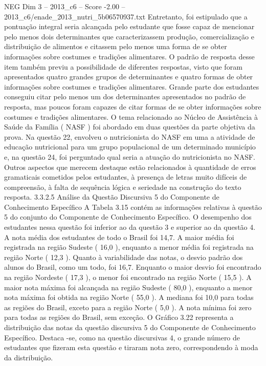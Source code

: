\begin{textsample}{NEG Dim 3 – 2013\_c6 – Score -2.00 – 2013\_c6/enade\_2013\_nutri\_5b06570937.txt}
Entretanto, foi estipulado que a pontuação integral seria alcançada pelo estudante que fosse capaz de mencionar pelo menos dois determinantes que caracterizassem produção, comercialização e distribuição de alimentos e citassem pelo menos uma forma de se obter informações sobre costumes e tradições alimentares.
O padrão de resposta desse item também previu a possibilidade de diferentes respostas, visto que foram apresentados quatro grandes grupos de determinantes e quatro formas de obter informações sobre costumes e tradições alimentares.
Grande parte dos estudantes conseguiu citar pelo menos um dos determinantes apresentados no padrão de resposta, mas poucos foram capazes de citar formas de se obter informações sobre costumes e tradições alimentares.
O tema relacionado ao Núcleo de Assistência à Saúde da Família ( NASF ) foi abordado em duas questões da parte objetiva da prova.
Na questão 22, envolveu o nutricionista do NASF em uma a atividade de educação nutricional para um grupo populacional de um determinado município e, na questão 24, foi perguntado qual seria a atuação do nutricionista no NASF.
Outros aspectos que merecem destaque estão relacionados à quantidade de erros gramaticais cometidos pelos estudantes, à presença de letras muito difíceis de compreensão, à falta de sequência lógica e seriedade na construção do texto resposta. 3.3.2.5 Análise da Questão Discursiva 5 do Componente de Conhecimento Específico A Tabela 3.15 contém as informações relativas à questão 5 do conjunto do Componente de Conhecimento Específico.
O desempenho dos estudantes nessa questão foi inferior ao da questão 3 e superior ao da questão 4.
A nota média dos estudantes de todo o Brasil foi 14,7.
A maior média foi registrada na região Sudeste ( 16,0 ), enquanto a menor média foi registrada na região Norte ( 12,3 ).
Quanto à variabilidade das notas, o desvio padrão dos alunos do Brasil, como um todo, foi 16,7.
Enquanto o maior desvio foi encontrado na região Nordeste ( 17,3 ), o menor foi encontrado na região Norte ( 15,5 ).
A maior nota máxima foi alcançada na região Sudeste ( 80,0 ), enquanto a menor nota máxima foi obtida na região Norte ( 55,0 ).
A mediana foi 10,0 para todas as regiões do Brasil, exceto para a região Norte ( 5,0 ).
A nota mínima foi zero para todas as regiões do Brasil, sem exceção.
O Gráfico 3.22 representa a distribuição das notas da questão discursiva 5 do Componente de Conhecimento Específico.
Destaca -se, como na questão discursivas 4, o grande número de estudantes que fizeram esta questão e tiraram nota zero, correspondendo à moda da distribuição.

\end{textsample}
